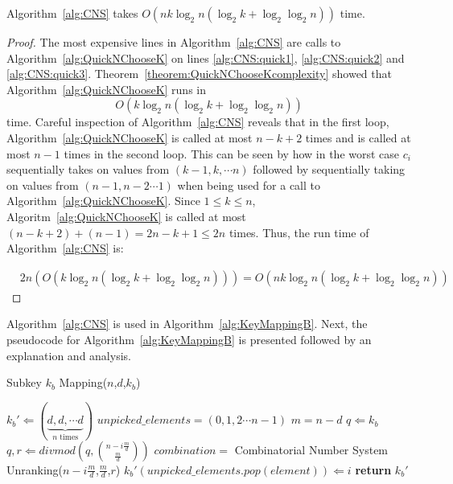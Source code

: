 \begin{theorem}
\label{theorem:CNStimeComplexity}
Algorithm~\ref{alg:CNS} takes $O\left(nk\log_2 n(\log_2 k+\log_2\log_2 n)\right)$ time.
\end{theorem}
\begin{proof}
The most expensive lines in Algorithm~\ref{alg:CNS} are calls to Algorithm~\ref{alg:QuickNChooseK} on lines \ref{alg:CNS:quick1}, \ref{alg:CNS:quick2} and \ref{alg:CNS:quick3}. Theorem~\ref{theorem:QuickNChooseKcomplexity} showed that Algorithm~\ref{alg:QuickNChooseK} runs in $$O\left(k\log_2 n(\log_2 k+\log_2\log_2 n)\right)$$ time. Careful inspection of Algorithm~\ref{alg:CNS} reveals that in the first loop, Algorithm~\ref{alg:QuickNChooseK} is called at most $n - k +2$ times and is called at most $n-1$ times in the second loop. This can be seen by how in the worst case $c_i$ sequentially takes on values from $(k-1,k, \cdots n)$ followed by sequentially taking on values from $(n-1,n-2 \cdots 1)$ when being used for a call to Algorithm~\ref{alg:QuickNChooseK}. Since $1 \leq k \leq n$, Algoritm~\ref{alg:QuickNChooseK} is called at most $(n - k + 2) + (n-1) = 2n - k + 1 \leq 2n$ times. Thus, the run time of Algorithm~\ref{alg:CNS} is:

\begin{align}
&2n (O\left(k\log_2 n(\log_2 k+\log_2\log_2 n)\right)) = O\left(nk\log_2 n(\log_2 k+\log_2\log_2 n)\right)
\end{align}
\end{proof}

Algorithm~\ref{alg:CNS} is used in Algorithm~\ref{alg:KeyMappingB}. Next, the pseudocode for Algorithm~\ref{alg:KeyMappingB} is presented followed by an explanation and analysis. 

\begin{algorithm}[H]
  \caption{Subkey $k_b$ Mapping($n$,$d$,$k_b$)}  \label{alg:KeyMappingB}
  \begin{algorithmic}[1]
  \State $k_b' \Longleftarrow (\underbrace{d, d, \cdots d}_{n \text{ times}})$
  \State $\mathit{unpicked\_elements} = (0,1,2 \cdots n-1)$
  \State $m = n - d$
  \State $q \Longleftarrow k_b$
   \label{alg:KeyMappingB:mainLoop}
  \State $q,r \Longleftarrow \mathit{divmod}(q,{n - i\frac{m}{d} \choose \frac{m}{d}})$ \label{alg:KeyMappingB:divmod}
  \State $\mathit{combination} =$ Combinatorial Number System Unranking($n - i\frac{m}{d}$,$\frac{m}{d}$,$r$) \label{alg:KeyMappingB:CNScall} \label{alg:KeyMappingB:CNS}
  \State $k_b'(\mathit{unpicked\_elements}.\mathit{pop}(\mathit{element})) \Longleftarrow i$ \label{alg:KeyMappingB:addToPermutation}
  \EndFor
  \EndFor
  \State \textbf{return} $k_b'$
  \end{algorithmic}
\end{algorithm}

